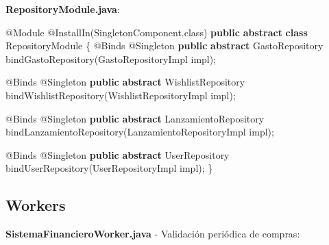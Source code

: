 \documentclass[
  spanish,
  11pt,
  paper=a4,
  ,captions=tableheading
]{scrartcl}
\newenvironment{Shaded}{}{}
\newcommand{\AttributeTok}[1]{\textcolor[rgb]{0.49,0.56,0.16}{#1}}
\newcommand{\FunctionTok}[1]{\textcolor[rgb]{0.02,0.16,0.49}{#1}}
\newcommand{\KeywordTok}[1]{\textcolor[rgb]{0.00,0.44,0.13}{\textbf{#1}}}
\newcommand{\NormalTok}[1]{#1}
\newcommand{\OperatorTok}[1]{\textcolor[rgb]{0.40,0.40,0.40}{#1}}
\begin{document}
\textbf{RepositoryModule.java}:

\begin{Shaded}
\begin{Highlighting}[]
\AttributeTok{@Module}
\AttributeTok{@InstallIn}\OperatorTok{(}\NormalTok{SingletonComponent}\OperatorTok{.}\FunctionTok{class}\OperatorTok{)}
\KeywordTok{public} \KeywordTok{abstract} \KeywordTok{class}\NormalTok{ RepositoryModule }\OperatorTok{\{}
    \AttributeTok{@Binds} \AttributeTok{@Singleton}
    \KeywordTok{public} \KeywordTok{abstract}\NormalTok{ GastoRepository }\FunctionTok{bindGastoRepository}\OperatorTok{(}\NormalTok{GastoRepositoryImpl impl}\OperatorTok{);}

    \AttributeTok{@Binds} \AttributeTok{@Singleton}
    \KeywordTok{public} \KeywordTok{abstract}\NormalTok{ WishlistRepository }\FunctionTok{bindWishlistRepository}\OperatorTok{(}\NormalTok{WishlistRepositoryImpl impl}\OperatorTok{);}

    \AttributeTok{@Binds} \AttributeTok{@Singleton}
    \KeywordTok{public} \KeywordTok{abstract}\NormalTok{ LanzamientoRepository }\FunctionTok{bindLanzamientoRepository}\OperatorTok{(}\NormalTok{LanzamientoRepositoryImpl impl}\OperatorTok{);}

    \AttributeTok{@Binds} \AttributeTok{@Singleton}
    \KeywordTok{public} \KeywordTok{abstract}\NormalTok{ UserRepository }\FunctionTok{bindUserRepository}\OperatorTok{(}\NormalTok{UserRepositoryImpl impl}\OperatorTok{);}
\OperatorTok{\}}
\end{Highlighting}
\end{Shaded}

\hypertarget{workers}{%
\subsection{Workers}\label{workers}}

\textbf{SistemaFinancieroWorker.java} - Validación periódica de compras:
\end{document}
